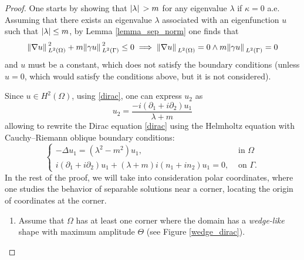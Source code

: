 \begin{proof}
    One starts by showing that \(\abs*{\lambda}>m\) for any eigenvalue \(\lambda\) if \(\kappa = 0\) a.e. Assuming that there exists an eigenvalue \(\lambda\) associated with an eigenfunction \(u\) such that \(\abs{\lambda} \leq m\), by Lemma \ref{lemma_sep_norm} one finds that 
    \[
    \norm*{\nabla u }_{L^2(\Omega)}^2 + m \norm*{\gamma u}_{L^2(\Gamma)}^2 \leq 0 \implies \norm*{\nabla u }_{L^2(\Omega)} = 0 \land m \norm*{\gamma u}_{L^2(\Gamma)} = 0
    \]
    and \(u\) must be a constant, which does not satisfy the boundary conditions (unless \(u=0\), which would satisfy the conditions above, but it is not considered).

    Since \(u \in H^2(\Omega)\), using \eqref{dirac}, one can express \(u_2\) as
    \[
    u_2 = \frac{-i (\partial_1 + i\partial_2)u_1}{\lambda + m}    
    \]
    allowing to rewrite the Dirac equation \eqref{dirac} using the Helmholtz equation with Cauchy–Riemann oblique boundary conditions:
    \begin{equation}\label{helm_system}
        \begin{cases}
            -\Delta u_1 = (\lambda^2 - m^2)u_1, & \text{ in } \Omega\\
             i (\partial_1 + i\partial_2)u_1 + (\lambda + m)i(n_1 + i n_2)u_1 = 0, & \text{ on } \Gamma.
        \end{cases}      
    \end{equation}
    In the rest of the proof, we will take into consideration polar coordinates, where one studies the behavior of separable solutions near a corner, locating the origin of coordinates at the corner. 

    \begin{enumerate}
    \item Assume that \(\Omega\) has at least one corner where the domain has a \textit{wedge-like} shape with maximum amplitude \(\Theta\) (see Figure \ref{wedge_dirac}).
    
    \usetikzlibrary{decorations.pathmorphing}
    \begin{figure}[H]
    \centering
\end{figure}
\end{enumerate}
\end{proof}
